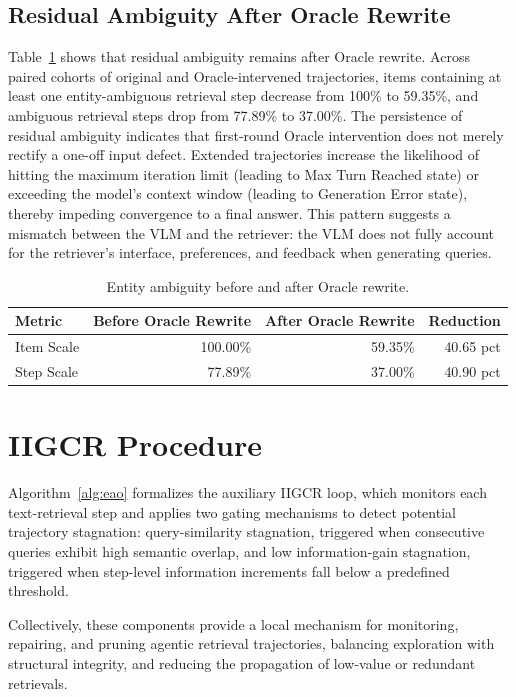 \documentclass{article} %
\begin{document}
\subsection{Residual Ambiguity After Oracle Rewrite}
Table~\ref{tab:oracle-rewrite-entity-ambiguity} shows that residual ambiguity remains after Oracle rewrite. Across paired cohorts of original and Oracle-intervened trajectories, items containing at least one entity-ambiguous retrieval step decrease from 100\% to 59.35\%, and ambiguous retrieval steps drop from 77.89\% to 37.00\%. 
The persistence of residual ambiguity indicates that first-round Oracle intervention does not merely rectify a one-off input defect. 
Extended trajectories increase the likelihood of hitting the maximum iteration limit (leading to Max Turn Reached state) or exceeding the model’s context window (leading to Generation Error state), thereby impeding convergence to a final answer. This pattern suggests a mismatch between the VLM and the retriever: the VLM does not fully account for the retriever's interface, preferences, and feedback when generating queries.
\begin{table}[htbp]
\centering
\small
\setlength{\tabcolsep}{6pt}
\caption{Entity ambiguity before and after Oracle rewrite.}
\begin{tabular}{lrrr}
\hline
\textbf{Metric} & \textbf{Before Oracle Rewrite} & \textbf{After Oracle Rewrite} & \textbf{Reduction} \\
\hline
Item Scale & 100.00\% & 59.35\% & 40.65 pct \\
Step Scale & 77.89\% & 37.00\% & 40.90 pct \\
\hline
\end{tabular}
\label{tab:oracle-rewrite-entity-ambiguity}
\end{table}

\section{IIGCR Procedure}\label{app:algorithm}
Algorithm~\ref{alg:eao} formalizes the auxiliary IIGCR loop, which monitors each text-retrieval step and applies two gating mechanisms to detect potential trajectory stagnation: query-similarity stagnation, triggered when consecutive queries exhibit high semantic overlap, and low information-gain stagnation, triggered when step-level information increments fall below a predefined threshold.


Collectively, these components provide a local mechanism for monitoring, repairing, and pruning agentic retrieval trajectories, balancing exploration with structural integrity, and reducing the propagation of low-value or redundant retrievals.
\clearpage
\end{document}
